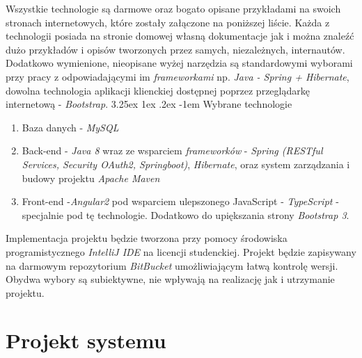 \documentclass[10pt,titlepage]{article} %
\makeatletter
\renewcommand{\normalsize}{\fontsize{8pt}{10pt}\selectfont} %
\renewcommand\paragraph{\@startsection{paragraph}{5}{\z@}%
  {3.25ex \@plus1ex \@minus.2ex}%
  {-1em}%
  {\normalfont\normalsize\bfseries}}
\makeatother
\begin{document}
Wszystkie technologie są darmowe oraz bogato opisane przykładami na swoich stronach internetowych, które zostały załączone na poniższej liście. Każda z technologii posiada na stronie domowej własną dokumentacje jak i można znaleźć dużo przykładów i opisów tworzonych przez samych, niezależnych, internautów. Dodatkowo wymienione, nieopisane wyżej narzędzia są standardowymi wyborami przy pracy z odpowiadającymi im \textit{frameworkami} np. \textit{Java - Spring + Hibernate}, dowolna technologia aplikacji klienckiej dostępnej poprzez przeglądarkę internetową - \textit{Bootstrap}. 
\paragraph{Wybrane technologie}
\begin{enumerate}[1.]
\item Baza danych - \textit{MySQL}\cite{mysql}
\item Back-end - \textit{Java 8}\cite{java8} wraz ze wsparciem \textit{frameworków} - \textit{Spring (RESTful Services, Security OAuth2, Springboot)}\cite{spring}, \textit{Hibernate}\cite{hibernate}, oraz system zarządzania i budowy projektu \textit{Apache Maven}\cite{maven}
\item Front-end -\textit{Angular2}\cite{angular2} pod wsparciem ulepszonego JavaScript - \textit{TypeScript} - specjalnie pod tę technologie. Dodatkowo do upiększania strony \textit{Bootstrap 3}\cite{bootstrap}.
\end{enumerate}
Implementacja projektu będzie tworzona przy pomocy środowiska programistycznego \textit{IntelliJ IDE}\cite{intelliJ} na licencji studenckiej. Projekt będzie zapisywany na darmowym repozytorium \textit{BitBucket}\cite{bitbucket} umożliwiającym łatwą kontrolę wersji. Obydwa wybory są subiektywne, nie wpływają na realizację jak i utrzymanie projektu.
\newpage
\section{Projekt systemu}
\end{document}
